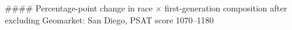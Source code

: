 #### Percentage-point change in race × first-generation composition after excluding Geomarket: San Diego, PSAT score 1070–1180
